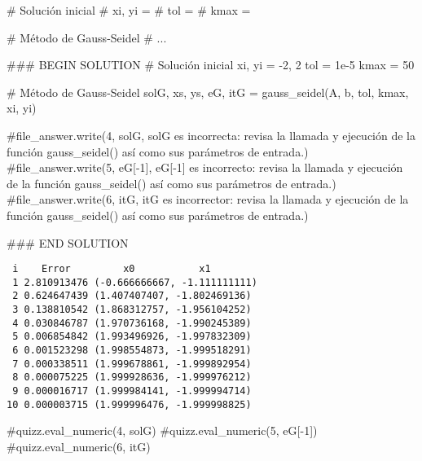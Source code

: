 \documentclass[
  letterpaper,
  DIV=11,
  numbers=noendperiod]{scrreprt}
\newenvironment{Shaded}{\begin{snugshade}}{\end{snugshade}}
\newcommand{\CommentTok}[1]{\textcolor[rgb]{0.37,0.37,0.37}{#1}}
\newcommand{\DecValTok}[1]{\textcolor[rgb]{0.68,0.00,0.00}{#1}}
\newcommand{\FloatTok}[1]{\textcolor[rgb]{0.68,0.00,0.00}{#1}}
\newcommand{\NormalTok}[1]{\textcolor[rgb]{0.00,0.23,0.31}{#1}}
\newcommand{\OperatorTok}[1]{\textcolor[rgb]{0.37,0.37,0.37}{#1}}
\newcommand{\RegionMarkerTok}[1]{\textcolor[rgb]{0.00,0.23,0.31}{#1}}
\begin{document}
\begin{Shaded}
\begin{Highlighting}[]
\CommentTok{\# Solución inicial}
\CommentTok{\# xi, yi = }
\CommentTok{\# tol = }
\CommentTok{\# kmax = }

\CommentTok{\# Método de Gauss{-}Seidel}
\CommentTok{\# ...}

\CommentTok{\#\#\# }\RegionMarkerTok{BEGIN}\CommentTok{ SOLUTION}
\CommentTok{\# Solución inicial}
\NormalTok{xi, yi }\OperatorTok{=} \OperatorTok{{-}}\DecValTok{2}\NormalTok{, }\DecValTok{2}
\NormalTok{tol }\OperatorTok{=} \FloatTok{1e{-}5}
\NormalTok{kmax }\OperatorTok{=} \DecValTok{50}

\CommentTok{\# Método de Gauss{-}Seidel}
\NormalTok{solG, xs, ys, eG, itG }\OperatorTok{=}\NormalTok{ gauss\_seidel(A, b, tol, kmax, xi, yi)}

\CommentTok{\#file\_answer.write(\textquotesingle{}4\textquotesingle{}, solG, \textquotesingle{}solG es incorrecta: revisa la llamada y ejecución de la función gauss\_seidel() así como sus parámetros de entrada.\textquotesingle{})}
\CommentTok{\#file\_answer.write(\textquotesingle{}5\textquotesingle{}, eG[{-}1], \textquotesingle{}eG[{-}1] es incorrecto: revisa la llamada y ejecución de la función gauss\_seidel() así como sus parámetros de entrada.\textquotesingle{})}
\CommentTok{\#file\_answer.write(\textquotesingle{}6\textquotesingle{}, itG, \textquotesingle{}itG es incorrector: revisa la llamada y ejecución de la función gauss\_seidel() así como sus parámetros de entrada.\textquotesingle{})}

\CommentTok{\#\#\# }\RegionMarkerTok{END}\CommentTok{ SOLUTION}
\end{Highlighting}
\end{Shaded}

\begin{verbatim}
 i    Error         x0           x1     
 1 2.810913476 (-0.666666667, -1.111111111)
 2 0.624647439 (1.407407407, -1.802469136)
 3 0.138810542 (1.868312757, -1.956104252)
 4 0.030846787 (1.970736168, -1.990245389)
 5 0.006854842 (1.993496926, -1.997832309)
 6 0.001523298 (1.998554873, -1.999518291)
 7 0.000338511 (1.999678861, -1.999892954)
 8 0.000075225 (1.999928636, -1.999976212)
 9 0.000016717 (1.999984141, -1.999994714)
10 0.000003715 (1.999996476, -1.999998825)
\end{verbatim}

\begin{Shaded}
\begin{Highlighting}[]
\CommentTok{\#quizz.eval\_numeric(\textquotesingle{}4\textquotesingle{}, solG)}
\CommentTok{\#quizz.eval\_numeric(\textquotesingle{}5\textquotesingle{}, eG[{-}1])}
\CommentTok{\#quizz.eval\_numeric(\textquotesingle{}6\textquotesingle{}, itG)}
\end{Highlighting}
\end{Shaded}
\end{document}
